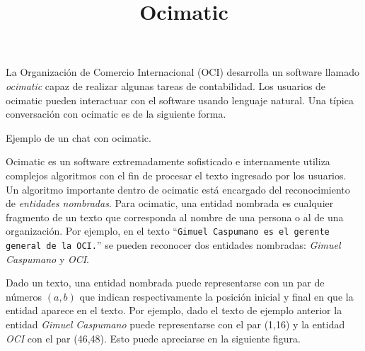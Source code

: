 \documentclass{oci}
\title{Ocimatic}
\begin{document}
\begin{problemDescription}
La Organización de Comercio Internacional (OCI) desarrolla un software llamado
\emph{ocimatic} capaz de realizar algunas tareas de contabilidad.
Los usuarios de ocimatic pueden interactuar con el software usando lenguaje
natural.
Una típica conversación con ocimatic es de la siguiente forma.

\begin{center}
  Ejemplo de un chat con ocimatic.
\end{center}

Ocimatic es un software extremadamente sofisticado e internamente utiliza
complejos algoritmos con el fin de procesar el texto ingresado por los usuarios.
Un algoritmo importante dentro de ocimatic está encargado del reconocimiento de
\emph{entidades nombradas}.
Para ocimatic, una entidad nombrada es cualquier fragmento de un texto que
corresponda al nombre de una persona o al de una organización.
Por ejemplo, en el texto ``\texttt{Gimuel Caspumano es el gerente general
  de la OCI.}''
se pueden reconocer dos entidades nombradas: \emph{Gimuel Caspumano} y \emph{OCI}.

Dado un texto, una entidad nombrada puede representarse con un par de números
$(a,b)$ que indican respectivamente la posición inicial y final en que la
entidad aparece en el texto.
Por ejemplo, dado el texto de ejemplo anterior la entidad \emph{Gimuel Caspumano}
puede representarse con el par (1,16) y la entidad \emph{OCI} con el par
(46,48).
Esto puede apreciarse en la siguiente figura.

\vspace{1em}
\vspace{0.5em}


\end{problemDescription}
\end{document}
